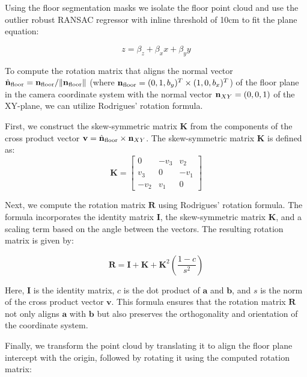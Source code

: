 Using the floor segmentation masks we isolate the floor point cloud and use the outlier robust RANSAC regressor with inline threshold of 10cm to fit the plane equation:

\begin{equation}
    z = \beta_z + \beta_x x + \beta_y y
\end{equation}


To compute the rotation matrix that aligns the normal vector $\hat{\boldsymbol{\mathbf{n}}}_\text{floor} = \boldsymbol{\mathbf{n}}_\text{floor} / \| \boldsymbol{\mathbf{n}}_\text{floor} \|$ (where $\boldsymbol{\mathbf{n}}_\text{floor} = (0, 1, b_y)^T \times (1, 0, b_x)^T$) of the floor plane in the camera coordinate system with the normal vector $\boldsymbol{\mathbf{n}}_{XY} = (0, 0, 1)$ of the XY-plane, we can utilize Rodrigues' rotation formula. 

First, we construct the skew-symmetric matrix $\mathbf{K}$ from the components of the cross product vector $\boldsymbol{\mathbf{v}} = \hat{\boldsymbol{\mathbf{n}}}_\text{floor} \times \boldsymbol{\mathbf{n}}_{XY}$. The skew-symmetric matrix $\mathbf{K}$ is defined as:
\begin{equation}
    \mathbf{K} = \begin{bmatrix}
        0 & -v_3 & v_2 \\
        v_3 & 0 & -v_1 \\
        -v_2 & v_1 & 0
    \end{bmatrix}
\end{equation}

Next, we compute the rotation matrix $\mathbf{R}$ using Rodrigues' rotation formula. The formula incorporates the identity matrix $\mathbf{I}$, the skew-symmetric matrix $\mathbf{K}$, and a scaling term based on the angle between the vectors. The resulting rotation matrix is given by:

\begin{equation}
    \mathbf{R} = \mathbf{I} + \mathbf{K} + \mathbf{K}^2 \left(\frac{1 - c}{s^2}\right)
\end{equation}

Here, $\mathbf{I}$ is the identity matrix, $c$ is the dot product of $\mathbf{a}$ and $\mathbf{b}$, and $s$ is the norm of the cross product vector $\mathbf{v}$. This formula ensures that the rotation matrix $\mathbf{R}$ not only aligns $\mathbf{a}$ with $\mathbf{b}$ but also preserves the orthogonality and orientation of the coordinate system.

Finally, we transform the point cloud by translating it to align the floor plane intercept with the origin, followed by rotating it using the computed rotation matrix:


